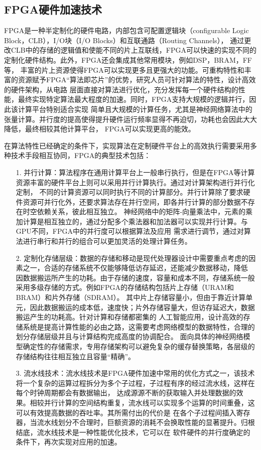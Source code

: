 \subsection{FPGA硬件加速技术}

FPGA是一种半定制化的硬件电路，内部包含可配置逻辑块（configurable Logic Block，CLB），I/O块（I/O Blocks）和互联通路（Routing Channels），
通过更改CLB中的存储的逻辑值和使能不同的片上互联线，FPGA可以快速的实现不同的定制化硬件结构。此外，FPGA还会集成其他常用模块，例如DSP，BRAM，FF等，
丰富的片上资源使得FPGA可以实现更多且更强大的功能。可重构特性和丰富的资源赋予FPGA“算法即芯片”的优势，研究人员可针对算法的特性，设计高效的硬件架构，从电路
层面直接对算法进行优化，充分发挥每一个硬件结构的性能，最终实现特定算法最大程度的加速。同时，FPGA支持大规模的逻辑并行，因此该计算平台特别适合实现
简单且大规模的计算任务，尤其是神经网络算法中的张量计算。并行度的提高使得提升硬件运行频率显得不再迫切，功耗也会因此大大降低，最终相较其他计算平台，
FPGA可以实现更高的能效。

在算法特性已经确定的条件下，实现算法在定制硬件平台上的高效执行需要采用多种技术手段相互协同，FPGA的典型技术包括：

\begin{itemize}
\vspace{4pt}
\item[1.]并行计算：算法程序在通用计算平台上一般串行执行，但是在FPGA等计算资源丰富的硬件平台上则可以采用并行计算执行。通过对计算架构进行并行化定制，
不同的计算资源可以同时执行不同的计算部分。并行计算除了要求硬件资源可并行化外，还要求算法存在并行空间，即各并行计算的部分数据不存在时空依赖关系，彼此相互独立。
神经网络中的矩阵-向量乘法中，元素的乘加计算是相互独立的，通过分配多个乘法器和加法器可以实现并行计算。与GPU不同，FPGA中的并行度可以根据算法及应用
需求进行调节，通过对算法进行串行和并行的组合可以更加灵活的处理计算任务。
\vspace{4pt}
\item[2.]定制化存储层级：数据的存储和移动是现代处理器设计中需要重点考虑的因素之一，合适的存储系统不仅能够降低访存延迟，还能减少数据移动，降低
因数据搬运所产生的功耗。由于存储的速度，容量和成本不同，存储系统一般采用多级存储的方式。例如FPGA的存储结构包括片上存储（URAM和BRAM）和片外存储（SDRAM）。
其中片上存储容量小，但由于靠近计算单元，因此数据搬运的成本低，速度快；片外存储容量大，但访存延迟大，数据搬运产生的功耗高。针对计算和存储都密集的
人工智能应用，设计高效的存储系统是提高计算性能的必由之路，这需要考虑网络模型的数据特性，合理的划分存储层级并且与计算结构完成高度的协调配合。
面向具体的神经网络模型确定性的存储需求，专用存储架构可以避免复杂的缓存替换策略，各层级的存储结构往往相互独立且容量“精确”。
\vspace{4pt}
\item[3.]流水线技术：流水线技术是FPGA硬件加速中常用的优化方式之一，该技术将一个复杂的运算过程拆分为多个子过程，子过程有序的经过流水线，这样在每个时钟周期都会有数据输出，
达成源源不断的获取输入并处理数据的效果。相较并行计算的空间结构重复，流水线可以实现多个运算的时间重叠，这可以有效提高数据的吞吐率。其所需付出的代价是
在各个子过程间插入寄存器，当流水线划分不合理时，巨额资源的消耗不会换取性能的显著提升。归根结底，流水线技术是一种性能优化技术，它可以在
软件硬件的并行度确定的条件下，再次实现对应用的加速。

\end{itemize}
